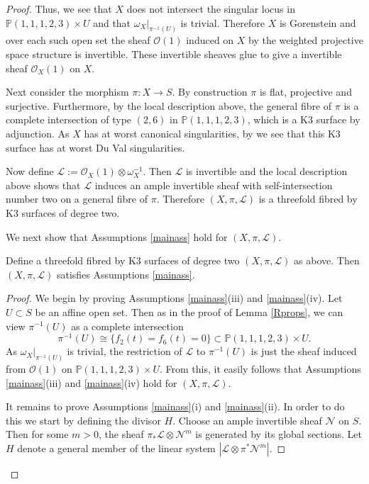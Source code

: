\documentclass{amsart}
\begin{document}
\begin{proof}
Thus, we see that $X$ does not intersect the singular locus in ${\mathbb{P}}{(1,1,1,2,3)} \times U$ and that $\omega_X|_{\pi^{-1}(U)}$ is trivial. Therefore $X$ is Gorenstein and over each such open set the sheaf ${\mathcal{O}}(1)$ induced on $X$ by the weighted projective space structure is invertible. These invertible sheaves glue to give a invertible sheaf ${\mathcal{O}}_{X}(1)$ on $X$.

Next consider the morphism $\pi\colon X \to S$. By construction $\pi$ is flat, projective and surjective. Furthermore, by the local description above, the general fibre of $\pi$ is a complete intersection of type $(2,6)$ in ${\mathbb{P}}{(1,1,1,2,3)}$, which is a K3 surface by adjunction. As $X$ has at worst canonical singularities, by \cite[Lemma 5.17]{bgav} we see that this K3 surface has at worst Du Val singularities. 

Now define ${\mathcal{L}} := {\mathcal{O}}_X(1) \otimes \omega_X^{-1}$. Then ${\mathcal{L}}$ is invertible and the local description above shows that ${\mathcal{L}}$ induces an ample invertible sheaf with self-intersection number two on a general fibre of $\pi$. Therefore $(X,\pi,{\mathcal{L}})$ is a threefold fibred by K3 surfaces of degree two.

We next show that Assumptions \ref{mainass} hold for $(X,\pi,{\mathcal{L}})$.

\begin{lemma}\label{asslem}  Define a threefold fibred by K3 surfaces of degree two $(X,\pi,{\mathcal{L}})$ as above. Then $(X,\pi,{\mathcal{L}})$ satisfies Assumptions \ref{mainass}.\end{lemma}

\begin{proof} We begin by proving Assumptions \ref{mainass}(iii) and \ref{mainass}(iv). Let $U \subset S$ be an affine open set. Then as in the proof of Lemma \ref{Rprops}, we can view $\pi^{-1}(U)$ as a complete intersection
\[\pi^{-1}(U) \cong \{ f_2(t) = f_6(t) = 0\} \subset {\mathbb{P}}(1,1,1,2,3) \times U.\]
As $\omega_X|_{\pi^{-1}(U)}$ is trivial, the restriction of ${\mathcal{L}}$ to $\pi^{-1}(U)$ is just the sheaf induced from ${\mathcal{O}}(1)$ on ${\mathbb{P}}(1,1,1,2,3) \times U$. From this, it easily follows that Assumptions \ref{mainass}(iii) and \ref{mainass}(iv) hold for $(X,\pi,{\mathcal{L}})$.

It remains to prove Assumptions \ref{mainass}(i) and \ref{mainass}(ii). In order to do this we start by defining the divisor $H$. Choose an ample invertible sheaf ${\mathcal{N}}$ on $S$. Then for some $m > 0$, the sheaf $\pi_*{\mathcal{L}} \otimes {\mathcal{N}}^m$ is generated by its global sections. Let $H$ denote a general member of the linear system $|{\mathcal{L}} \otimes \pi^* {\mathcal{N}}^m|$. 


\end{proof}
\end{proof}
\end{document}
